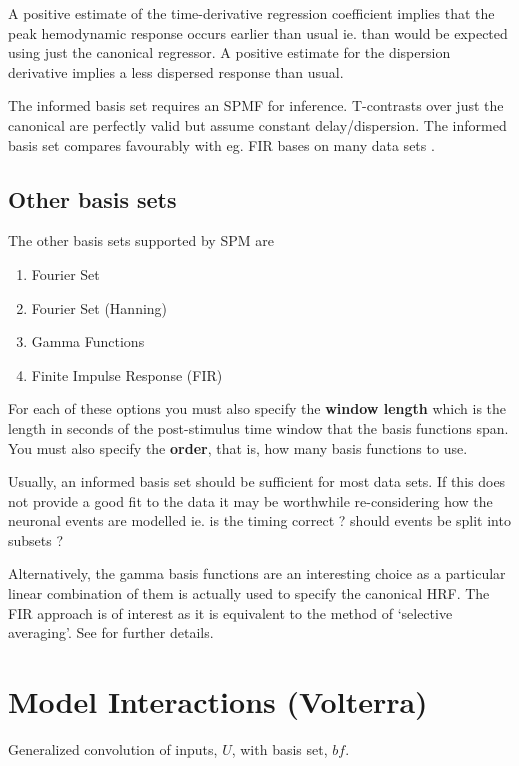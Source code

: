 A positive estimate of the time-derivative regression coefficient implies that the peak hemodynamic response occurs earlier than usual ie. than would be expected using just the canonical regressor. A positive estimate for the dispersion derivative implies a less dispersed response than usual.

The informed basis set requires an SPM{F} for inference. T-contrasts over just the canonical are perfectly valid but assume constant delay/dispersion. The informed basis set compares favourably with eg. FIR bases on many data sets \cite{rnah_basis}.

\subsection{Other basis sets}

The other basis sets supported by SPM are

\begin{enumerate}
\item{Fourier Set}
\item{Fourier Set (Hanning)}
\item{Gamma Functions}
\item{Finite Impulse Response (FIR)}
\end{enumerate}

For each of these options you must also specify the {\bf window length} which is the length in seconds of the post-stimulus time window that the basis functions span. You must also specify the {\bf order}, that is, how many basis functions to use.

Usually, an informed basis set should be sufficient for most data sets. If this does not provide a good fit to the data it may be worthwhile re-considering how the neuronal events are modelled ie. is the timing correct ? should events be split into subsets ? 

Alternatively, the gamma basis functions are an interesting choice as a particular linear combination of them is actually used to specify the canonical HRF. The FIR approach is of interest as it is equivalent to the method of `selective averaging'. See \cite{rnah_conv} for further details. 

\section{Model Interactions (Volterra)}

Generalized convolution of inputs, $U$, with basis set, $bf$.

